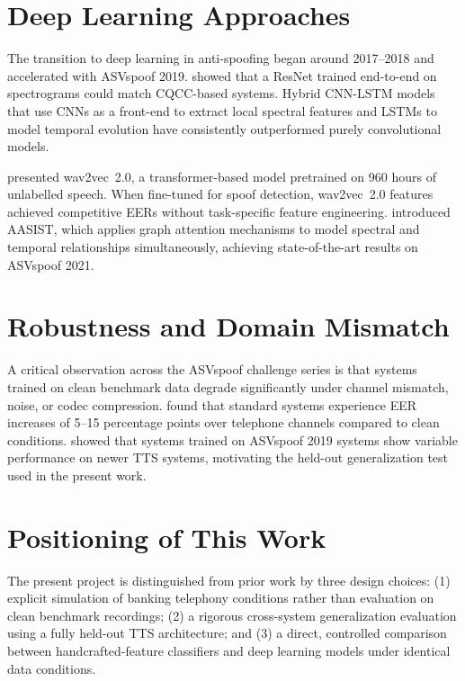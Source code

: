 \documentclass[12pt, a4paper, oneside]{report}
\begin{document}
\section{Deep Learning Approaches}

The transition to deep learning in anti-spoofing began around 2017--2018 and accelerated with ASVspoof 2019. \citet{alzantot2019} showed that a ResNet trained end-to-end on spectrograms could match CQCC-based systems. Hybrid CNN-LSTM models that use CNNs as a front-end to extract local spectral features and LSTMs to model temporal evolution have consistently outperformed purely convolutional models.

\citet{baevski2020} presented wav2vec~2.0, a transformer-based model pretrained on 960 hours of unlabelled speech. When fine-tuned for spoof detection, wav2vec~2.0 features achieved competitive EERs without task-specific feature engineering. \citet{wang2021aasist} introduced AASIST, which applies graph attention mechanisms to model spectral and temporal relationships simultaneously, achieving state-of-the-art results on ASVspoof 2021.

\section{Robustness and Domain Mismatch}

A critical observation across the ASVspoof challenge series is that systems trained on clean benchmark data degrade significantly under channel mismatch, noise, or codec compression. \citet{yi2022} found that standard systems experience EER increases of 5--15 percentage points over telephone channels compared to clean conditions. \citet{kinnunen2020} showed that systems trained on ASVspoof 2019 systems show variable performance on newer TTS systems, motivating the held-out generalization test used in the present work.

\section{Positioning of This Work}

The present project is distinguished from prior work by three design choices: (1) explicit simulation of banking telephony conditions rather than evaluation on clean benchmark recordings; (2) a rigorous cross-system generalization evaluation using a fully held-out TTS architecture; and (3) a direct, controlled comparison between handcrafted-feature classifiers and deep learning models under identical data conditions.
\end{document}
